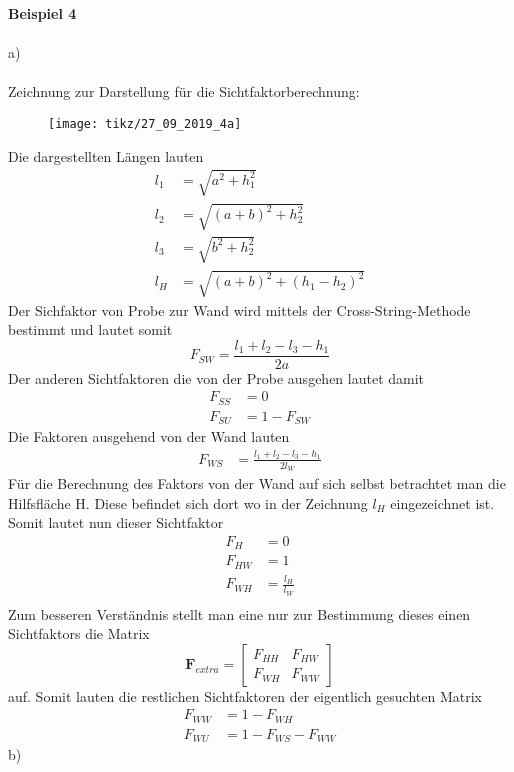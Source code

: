 \textbf{Beispiel 4}\\ \\
a)\\ \\
Zeichnung zur Darstellung für die Sichtfaktorberechnung:
\begin{figure}[h]
	\centering
	\texttt{[image: tikz/27\_09\_2019\_4a]}
\end{figure}
\newline
Die dargestellten Längen lauten
\begin{align*}
	l_1 &= \sqrt{a^2 + h_1^2} \\
	l_2 &= \sqrt{(a + b)^2 + h_2^2} \\
	l_3 &= \sqrt{b^2 + h_2^2} \\
	l_H &= \sqrt{(a + b)^2 + (h_1 - h_2)^2}
\end{align*}
Der Sichfaktor von Probe zur Wand wird mittels der Cross-String-Methode bestimmt und lautet somit
\[
	F_{SW} = \frac{l_1 + l_2 - l_3 - h_1}{2a}
\]
Der anderen Sichtfaktoren die von der Probe ausgehen lautet damit
\begin{align*}
	F_{SS} &= 0 \\
	F_{SU} &= 1 - F_{SW}
\end{align*}
Die Faktoren ausgehend von der Wand lauten
\begin{align*}
	F_{WS} &= \frac{l_1 + l_2 - l_3 - h_1}{2l_W}
\end{align*}
Für die Berechnung des Faktors von der Wand auf sich selbst betrachtet man die Hilfsfläche H. Diese befindet sich dort wo in der Zeichnung $l_H$ eingezeichnet ist. Somit lautet nun dieser Sichtfaktor
\begin{align*}
	F_{H} &= 0 \\
	F_{HW} &= 1 \\
	F_{WH} &= \frac{l_H}{l_W} \\
\end{align*}
Zum besseren Verständnis stellt man eine nur zur Bestimmung dieses einen Sichtfaktors die Matrix
\[
	\textbf{F}_{extra} = \begin{bmatrix}
		F_{HH} & F_{HW} \\
		F_{WH} & F_{WW}
	\end{bmatrix}
\]
auf. Somit lauten die restlichen Sichtfaktoren der eigentlich gesuchten Matrix
\begin{align*}
	F_{WW} &= 1 - F_{WH} \\
	F_{WU} &= 1 - F_{WS} - F_{WW}
\end{align*}
b)\\ \\
